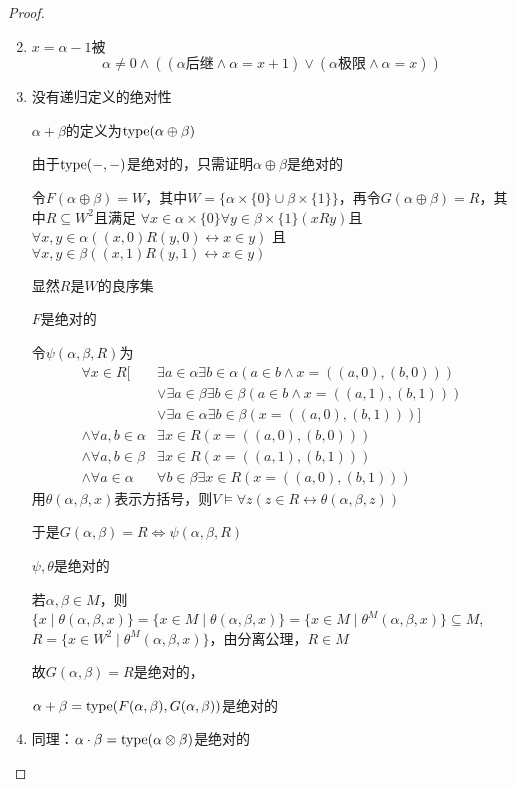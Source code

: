 \documentclass[11pt]{article}
\begin{document}
\begin{proof}
\begin{enumerate}
\setcounter{enumi}{1}
\item \(x=\alpha-1\)被
\begin{equation*}
\alpha\neq 0\wedge((\alpha\text{后继}\wedge\alpha=x+1)\vee(\alpha\text{极限}\wedge\alpha=x))
\end{equation*}
\item 没有递归定义的绝对性

\(\alpha+\beta\)的定义为\(\operatorname{type}(\alpha\oplus\beta)\)

由于\(\operatorname{type}(-,-)\)是绝对的，只需证明\(\alpha\oplus\beta\)是绝对的

令\(F(\alpha\oplus\beta)=W\)，其中\(W=\{\alpha\times\{0\}\cup\beta\times\{1\}\}\)，再令\(G(\alpha\oplus\beta)=R\)，其中\(R\subseteq W^2\)且满足
\(\forall x\in\alpha\times\{0\}\forall y\in\beta\times\{1\}(xRy)\)且\(\forall x,y\in\alpha((x,0)R(y,0)\leftrightarrow x\in y)\)
且\(\forall x,y\in\beta((x,1)R(y,1)\leftrightarrow x\in y)\)

显然\(R\)是\(W\)的良序集

\(F\)是绝对的

令\(\psi(\alpha,\beta,R)\)为
\begin{align*}
\forall x\in R[&\exists a\in\alpha\exists b\in\alpha(a\in b\wedge x=((a,0),(b,0)))\\
&\vee\exists a\in\beta\exists b\in\beta(a\in b\wedge x=((a,1),(b,1)))\\
&\vee\exists a\in\alpha\exists b\in\beta(x=((a,0),(b,1)))]\\
\wedge\forall a,b\in\alpha&\exists x\in R(x=((a,0),(b,0)))\\
\wedge\forall a,b\in\beta&\exists x\in R(x=((a,1),(b,1)))\\
\wedge\forall a\in\alpha&\forall b\in\beta\exists x\in R(x=((a,0),(b,1)))
\end{align*}
用\(\theta(\alpha,\beta,x)\)表示方括号，则\(V\vDash\forall z(z\in R\leftrightarrow\theta(\alpha,\beta,z))\)

于是\(G(\alpha,\beta)=R\Leftrightarrow\psi(\alpha,\beta,R)\)

\(\psi,\theta\)是绝对的

若\(\alpha,\beta\in M\)，则\(\{x\mid\theta(\alpha,\beta,x)\}=\{x\in M\mid\theta(\alpha,\beta,x)\}=\{x\in M\mid\theta^M(\alpha,\beta,x)\}\subseteq M\),
\(R=\{x\in W^2\mid\theta^M(\alpha,\beta,x)\}\)，由分离公理，\(R\in M\)

故\(G(\alpha,\beta)=R\)是绝对的，

\(\alpha+\beta=\operatorname{type}(F(\alpha,\beta),G(\alpha,\beta))\)是绝对的
\item 同理：\(\alpha\cdot\beta=\operatorname{type}(\alpha\otimes\beta)\)是绝对的
\end{enumerate}
\end{proof}
\end{document}
